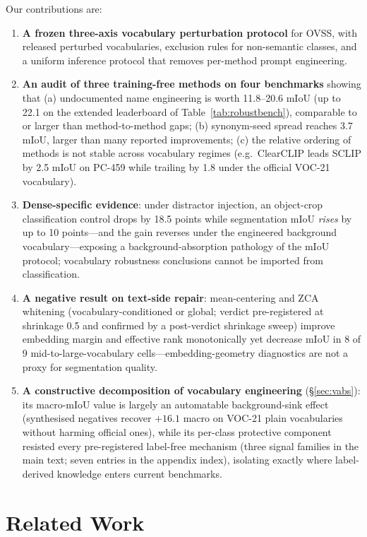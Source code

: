 \documentclass[11pt]{article}
\newcommand{\miou}{mIoU}
\begin{document}
Our contributions are:
\begin{enumerate}
\item \textbf{A frozen three-axis vocabulary perturbation protocol} for OVSS, with
  released perturbed vocabularies, exclusion rules for non-semantic classes, and a
  uniform inference protocol that removes per-method prompt engineering.
\item \textbf{An audit of three training-free methods on four benchmarks} showing that
  (a) undocumented name engineering is worth 11.8--20.6 \miou{} (up to 22.1 on the
  extended leaderboard of Table~\ref{tab:robustbench}), comparable to or larger
  than method-to-method gaps; (b) synonym-seed spread reaches 3.7 \miou{}, larger than
  many reported improvements; (c) the relative ordering of methods is not stable across
  vocabulary regimes (e.g.\ ClearCLIP leads SCLIP by 2.5 \miou{} on PC-459 while
  trailing by 1.8 under the official VOC-21 vocabulary).
\item \textbf{Dense-specific evidence}: under distractor injection, an object-crop
  classification control drops by 18.5 points while segmentation \miou{} \emph{rises}
  by up to 10 points---and the gain reverses under the engineered background
  vocabulary---exposing a background-absorption pathology of the \miou{} protocol;
  vocabulary robustness conclusions cannot be imported from classification.
\item \textbf{A negative result on text-side repair}: mean-centering and ZCA whitening
  (vocabulary-conditioned or global; verdict pre-registered at shrinkage 0.5 and
  confirmed by a post-verdict shrinkage sweep) improve embedding margin and effective
  rank monotonically yet decrease \miou{} in 8 of 9 mid-to-large-vocabulary
  cells---embedding-geometry diagnostics are not a proxy for segmentation quality.
\item \textbf{A constructive decomposition of vocabulary engineering}
  (\S\ref{sec:vabs}): its macro-\miou{} value is largely an automatable
  background-sink effect (synthesised negatives recover $+16.1$ macro on VOC-21
  plain vocabularies without harming official ones), while its per-class protective
  component resisted every pre-registered label-free mechanism (three signal
families in the main text; seven entries in the appendix index), isolating exactly
  where label-derived knowledge enters current benchmarks.
\end{enumerate}

\section{Related Work}
\end{document}
